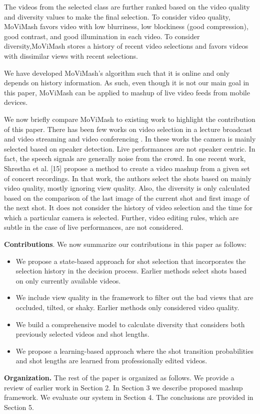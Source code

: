 \documentclass{sig-alternate}
\begin{document}
The videos from the selected class are further ranked based on the video quality and diversity values to make the ﬁnal selection. To consider video quality, MoViMash favors video with low blurriness, low blockiness (good compression), good contrast, and good illumination in each video. To consider diversity,MoViMash stores a history of recent video selections and favors videos with dissimilar views with recent selections. 

We have developed MoViMash’s algorithm such that it is online and only depends on history information. As such, even though it is not our main goal in this paper, MoViMash can be applied to mashup of live video feeds from mobile devices.

 We now brieﬂy compare MoViMash to existing work to highlight the contribution of this paper. There has been few works on video selection in a lecture broadcast and video streaming \cite{butcher1987numerical} \cite{economou1983green} and video conferencing \cite{fassas2002hematopoietic}. In these works the camera is mainly selected based on speaker detection. Live performances are not speaker centric. In fact, the speech signals are generally noise from the crowd. In one recent work, Shrestha et al. [15] propose a method to create a video mashup from a given set of concert recordings. In that work, the authors select the shots based on mainly video quality, mostly ignoring view quality. Also, the diversity is only calculated based on the comparison of the last image of the current shot and ﬁrst image of the next shot. It does not consider the history of video selection and the time for which a particular camera is selected. Further, video editing rules, which are subtle in the case of live performances, are not considered. 

\textbf {Contributions}. We now summarize our contributions in this paper as follows:
\begin{itemize}
\item We propose a state-based approach for shot selection that incorporates the selection history in the decision process. Earlier methods select shots based on only currently available videos. 
\item We include view quality in the framework to ﬁlter out the bad views that are occluded, tilted, or shaky. Earlier methods only considered video quality. 
\item We build a comprehensive model to calculate diversity that considers both previously selected videos and shot lengths. \item We propose a learning-based approach where the shot transition probabilities and shot lengths are learned from professionally edited videos. 
\end{itemize}
\textbf{Organization.} The rest of the paper is organized as follows. We provide a review of earlier work in Section 2. In Section 3 we describe proposed mashup framework. We evaluate our system in Section 4. The conclusions are provided in Section 5.
\end{document}
